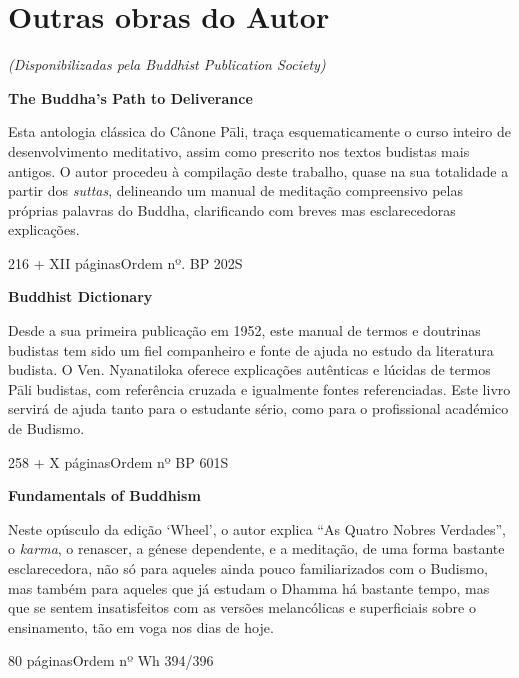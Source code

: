 \chapter{Outras obras do Autor}

{\centering
  \emph{(Disponibilizadas pela Buddhist Publication Society)}
\par}

\bigskip

\textbf{The Buddha's Path to Deliverance}

Esta antologia clássica do Cânone Pāli, traça esquematicamente o curso inteiro de desenvolvimento meditativo, assim como prescrito nos textos budistas mais antigos. O autor procedeu à compilação deste trabalho, quase na sua totalidade a partir dos \emph{suttas}, delineando um manual de meditação compreensivo pelas próprias palavras do Buddha, clarificando com breves mas esclarecedoras explicações.

216 + XII páginas\hfill Ordem nº. BP 202S

\bigskip

\textbf{Buddhist Dictionary}

Desde a sua primeira publicação em 1952, este manual de termos e doutrinas
budistas tem sido um fiel companheiro e fonte de ajuda no estudo da literatura
budista. O Ven. Nyanatiloka oferece explicações autênticas e lúcidas de termos
Pāli budistas, com referência cruzada e igualmente fontes referenciadas. Este
livro servirá de ajuda tanto para o estudante sério, como para o profissional
académico de Budismo.

258 + X páginas\hfill Ordem nº BP 601S

\clearpage

\textbf{Fundamentals of Buddhism}

Neste opúsculo da edição `Wheel', o autor explica ``As Quatro Nobres Verdades'',
o \emph{karma}, o renascer, a génese dependente, e a meditação, de uma forma
bastante esclarecedora, não só para aqueles ainda pouco familiarizados com o
Budismo, mas também para aqueles que já estudam o Dhamma há bastante
tempo, mas que se sentem insatisfeitos com as versões melancólicas e
superficiais sobre o ensinamento, tão em voga nos dias de hoje.

80 páginas\hfill Ordem nº Wh 394/396

